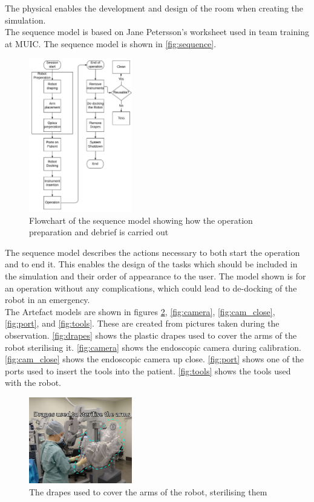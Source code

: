 \documentclass[paper=a4, fontsize=11pt]{scrartcl} %
\numberwithin{equation}{section} %
\numberwithin{figure}{section} %
\numberwithin{table}{section} %
\begin{document}
The physical enables the development and design of the room when creating the simulation.\\

The sequence model is based on Jane Petersson's worksheet used in team training at MUIC. The sequence model is shown in \autoref{fig:sequence}.

\begin{figure}[hbpt]
	\centering
	\includegraphics[width=0.4\textwidth]{sequencemodel}
	\caption{Flowchart of the sequence model showing how the operation preparation and debrief is carried out}
	\label{fig:sequence}
\end{figure}

The sequence model describes the actions necessary to both start the operation and to end it. This enables the design of the tasks which should be included in the simulation and their order of appearance to the user.
The model shown is for an operation without any complications, which could lead to de-docking of the robot in an emergency.\\


The Artefact models are shown in figures \ref{fig:drapes}, \ref{fig:camera}, \ref{fig:cam_close}, \ref{fig:port}, and \ref{fig:tools}. These are created from pictures taken during the observation. \autoref{fig:drapes} shows the plastic drapes used to cover the arms of the robot sterilising it. \autoref{fig:camera} shows the endoscopic camera during calibration. \autoref{fig:cam_close} shows the endoscopic camera up close. \autoref{fig:port} shows one of the ports used to insert the tools into the patient. \autoref{fig:tools} shows the tools used with the robot.


\begin{figure}[hbpt]
	\centering
	\includegraphics[width=0.4\textwidth]{drapes.pdf}
	\caption{The drapes used to cover the arms of the robot, sterilising them}
	\label{fig:drapes}
\end{figure}
\end{document}
